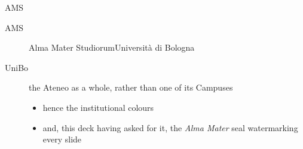 \begin{frame}[c]{AMS}
%
\begin{description}
	\item[AMS] Alma Mater Studiorum\textendash{}Università di Bologna
	\item[UniBo] the Ateneo as a whole, rather than one of its Campuses
	\begin{itemize}
		\item hence the institutional colours
		\item and, this deck having asked for it, the \emph{Alma Mater} seal watermarking every slide
	\end{itemize}
\end{description}
%
\end{frame}
